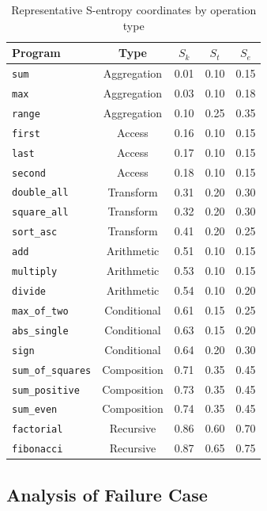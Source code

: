 \documentclass[twocolumn,10pt]{revtex4-2}
\theoremstyle{definition}
\theoremstyle{remark}
\begin{document}
\begin{table}[h]
\centering
\caption{Representative S-entropy coordinates by operation type}
\label{tab:s_coords_examples}
\small
\begin{tabular}{lcccc}
\toprule
\textbf{Program} & \textbf{Type} & \textbf{$S_k$} & \textbf{$S_t$} & \textbf{$S_e$} \\
\midrule
\texttt{sum} & Aggregation & 0.01 & 0.10 & 0.15 \\
\texttt{max} & Aggregation & 0.03 & 0.10 & 0.18 \\
\texttt{range} & Aggregation & 0.10 & 0.25 & 0.35 \\
\midrule
\texttt{first} & Access & 0.16 & 0.10 & 0.15 \\
\texttt{last} & Access & 0.17 & 0.10 & 0.15 \\
\texttt{second} & Access & 0.18 & 0.10 & 0.15 \\
\midrule
\texttt{double\_all} & Transform & 0.31 & 0.20 & 0.30 \\
\texttt{square\_all} & Transform & 0.32 & 0.20 & 0.30 \\
\texttt{sort\_asc} & Transform & 0.41 & 0.20 & 0.25 \\
\midrule
\texttt{add} & Arithmetic & 0.51 & 0.10 & 0.15 \\
\texttt{multiply} & Arithmetic & 0.53 & 0.10 & 0.15 \\
\texttt{divide} & Arithmetic & 0.54 & 0.10 & 0.20 \\
\midrule
\texttt{max\_of\_two} & Conditional & 0.61 & 0.15 & 0.25 \\
\texttt{abs\_single} & Conditional & 0.63 & 0.15 & 0.20 \\
\texttt{sign} & Conditional & 0.64 & 0.20 & 0.30 \\
\midrule
\texttt{sum\_of\_squares} & Composition & 0.71 & 0.35 & 0.45 \\
\texttt{sum\_positive} & Composition & 0.73 & 0.35 & 0.45 \\
\texttt{sum\_even} & Composition & 0.74 & 0.35 & 0.45 \\
\midrule
\texttt{factorial} & Recursive & 0.86 & 0.60 & 0.70 \\
\texttt{fibonacci} & Recursive & 0.87 & 0.65 & 0.75 \\
\bottomrule
\end{tabular}
\end{table}

\subsection{Analysis of Failure Case}
\end{document}
